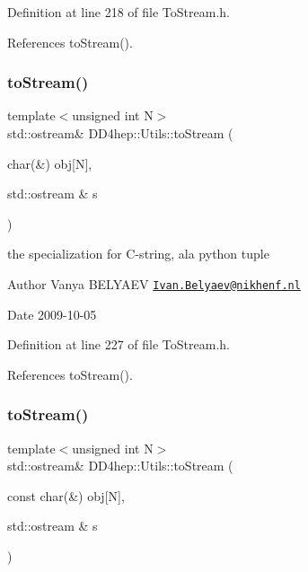 Definition at line 218 of file To\+Stream.\+h.



References to\+Stream().

\hypertarget{namespace_d_d4hep_1_1_utils_ae93240ec7d2befb47d6bd09e1d318380}{}\label{namespace_d_d4hep_1_1_utils_ae93240ec7d2befb47d6bd09e1d318380} 
\subsubsection{\texorpdfstring{to\+Stream()}{toStream()}\hspace{0.1cm}{\footnotesize\ttfamily [16/22]}}
{\footnotesize\ttfamily template$<$unsigned int N$>$ \\
std\+::ostream\& D\+D4hep\+::\+Utils\+::to\+Stream (\begin{DoxyParamCaption}\item[{char(\&)}]{obj\mbox{[}\+N\mbox{]},  }\item[{std\+::ostream \&}]{s }\end{DoxyParamCaption})}

the specialization for C-\/string, a\textquotesingle{}la python tuple \begin{DoxyAuthor}{Author}
Vanya B\+E\+L\+Y\+A\+EV \href{mailto:Ivan.Belyaev@nikhenf.nl}{\tt Ivan.\+Belyaev@nikhenf.\+nl} 
\end{DoxyAuthor}
\begin{DoxyDate}{Date}
2009-\/10-\/05 
\end{DoxyDate}


Definition at line 227 of file To\+Stream.\+h.



References to\+Stream().

\hypertarget{namespace_d_d4hep_1_1_utils_a44ffcb1297d43e7a738c41a669e40cd6}{}\label{namespace_d_d4hep_1_1_utils_a44ffcb1297d43e7a738c41a669e40cd6} 
\subsubsection{\texorpdfstring{to\+Stream()}{toStream()}\hspace{0.1cm}{\footnotesize\ttfamily [17/22]}}
{\footnotesize\ttfamily template$<$unsigned int N$>$ \\
std\+::ostream\& D\+D4hep\+::\+Utils\+::to\+Stream (\begin{DoxyParamCaption}\item[{const char(\&)}]{obj\mbox{[}\+N\mbox{]},  }\item[{std\+::ostream \&}]{s }\end{DoxyParamCaption})}

